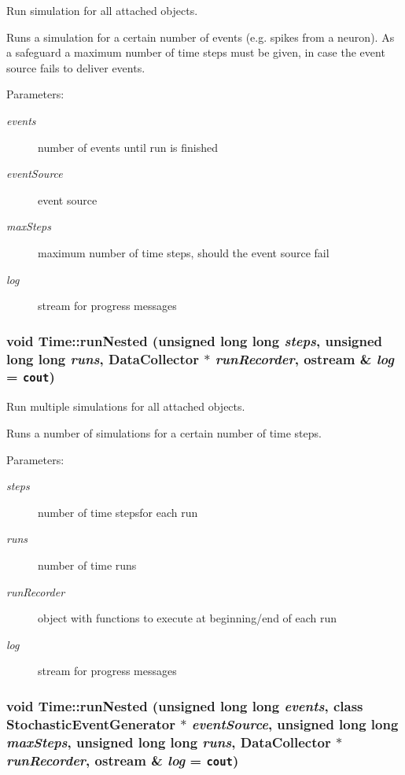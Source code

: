 Run simulation for all attached objects. 

Runs a simulation for a certain number of events (e.g. spikes from a neuron). As a safeguard a maximum number of time steps must be given, in case the event source fails to deliver events. \begin{Desc}
\item[Parameters: ]\par
\begin{description}
\item[{\em 
events}]number of events until run is finished \item[{\em 
eventSource}]event source \item[{\em 
maxSteps}]maximum number of time steps, should the event source fail \item[{\em 
log}]stream for progress messages \end{description}
\end{Desc}
\subsubsection[runNested]{\setlength{\rightskip}{0pt plus 5cm}void Time::runNested (unsigned long long {\em steps}, \/  unsigned long long {\em runs}, \/  {\bf DataCollector} $\ast$ {\em runRecorder}, \/  ostream \& {\em log} = {\tt cout})}\label{classTime_60e45b336cd984cf682d5c4b760cfcf7}


Run multiple simulations for all attached objects. 

Runs a number of simulations for a certain number of time steps. \begin{Desc}
\item[Parameters: ]\par
\begin{description}
\item[{\em 
steps}]number of time stepsfor each run \item[{\em 
runs}]number of time runs \item[{\em 
runRecorder}]object with functions to execute at beginning/end of each run \item[{\em 
log}]stream for progress messages \end{description}
\end{Desc}
\subsubsection[runNested]{\setlength{\rightskip}{0pt plus 5cm}void Time::runNested (unsigned long long {\em events}, \/  class {\bf StochasticEventGenerator} $\ast$ {\em eventSource}, \/  unsigned long long {\em maxSteps}, \/  unsigned long long {\em runs}, \/  {\bf DataCollector} $\ast$ {\em runRecorder}, \/  ostream \& {\em log} = {\tt cout})}\label{classTime_3f2d3b41a6bc9d8b1cea4de58fdf3674}


